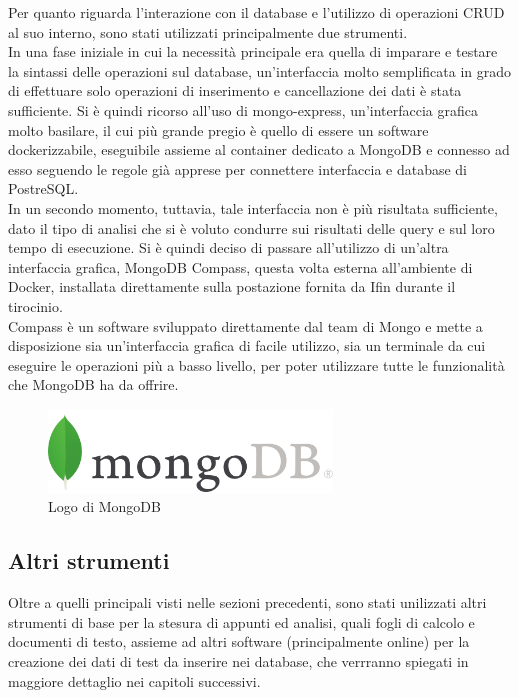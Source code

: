 \noindent Per quanto riguarda l'interazione con il database e l'utilizzo di operazioni CRUD al suo interno, sono stati utilizzati principalmente due strumenti.\\ 
In una fase iniziale in cui la necessità principale era quella di imparare e testare la sintassi delle operazioni sul database, un'interfaccia molto semplificata in grado di effettuare solo operazioni di inserimento e cancellazione dei dati è stata sufficiente. Si è quindi ricorso all'uso di mongo-express, un'interfaccia grafica molto basilare, il cui più grande pregio è quello di essere un software dockerizzabile, eseguibile assieme al container dedicato a MongoDB e connesso ad esso seguendo le regole già apprese per connettere interfaccia e database di PostreSQL.\\
In un secondo momento, tuttavia, tale interfaccia non è più risultata sufficiente, dato il tipo di analisi che si è voluto condurre sui risultati delle query e sul loro tempo di esecuzione.
Si è quindi deciso di passare all'utilizzo di un'altra interfaccia grafica, MongoDB Compass, questa volta esterna all'ambiente di Docker, installata direttamente sulla postazione fornita da Ifin durante il tirocinio.\\
Compass è un software sviluppato direttamente dal team di Mongo e mette a disposizione sia un'interfaccia grafica di facile utilizzo, sia un terminale da cui eseguire le operazioni più a basso livello, per poter utilizzare tutte le funzionalità che MongoDB ha da offrire.

\begin{figure}[htbp]
\begin{center}
\includegraphics[height=6em]{immagini/tecnologies-logos/MongoDB-Logo.png}
\caption{Logo di MongoDB}
\end{center}
\end{figure}

\subsection{Altri strumenti}
Oltre a quelli principali visti nelle sezioni precedenti, sono stati unilizzati altri strumenti di base per la stesura di appunti ed analisi, quali fogli di calcolo e documenti di testo, assieme ad altri software (principalmente online) per la creazione dei dati di test da inserire nei database, che verrranno spiegati in maggiore dettaglio nei capitoli successivi.\\

